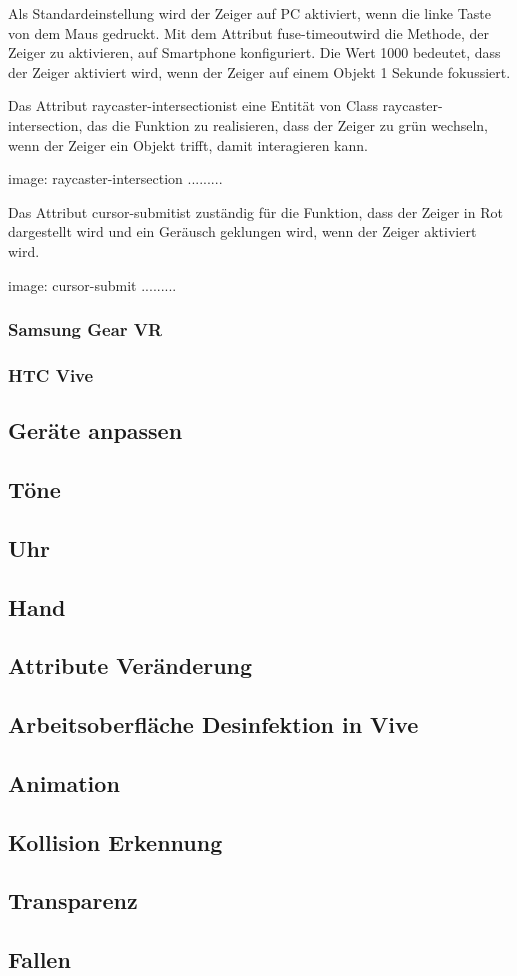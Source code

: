   Als Standardeinstellung wird der Zeiger auf PC aktiviert, wenn die linke Taste von dem Maus gedruckt. Mit dem Attribut \glqq fuse-timeout\grqq wird die Methode, der Zeiger zu aktivieren, auf Smartphone konfiguriert. Die Wert 1000 bedeutet, dass der Zeiger aktiviert wird, wenn der Zeiger auf einem Objekt 1 Sekunde fokussiert.
  
  Das Attribut \glqq raycaster-intersection\grqq ist eine Entität von Class \glqq raycaster-intersection\grqq, das die Funktion zu realisieren, dass der Zeiger zu grün wechseln, wenn der Zeiger ein Objekt trifft, damit interagieren kann.
  
  image: raycaster-intersection .........
  
  Das Attribut \glqq cursor-submit\grqq ist zuständig für die Funktion, dass der Zeiger in Rot dargestellt wird und ein Geräusch geklungen wird, wenn der Zeiger aktiviert wird. 
  
  image: cursor-submit .........
  
  
  \subsubsection{Samsung Gear VR}
  \subsubsection{HTC Vive}
 \subsection{Geräte anpassen}
 \subsection{Töne}
 \subsection{Uhr}
 \subsection{Hand}
 \subsection{Attribute Veränderung}
 
 \subsection{Arbeitsoberfläche Desinfektion in Vive}
 \subsection{Animation}
 \subsection{Kollision Erkennung}
 \subsection{Transparenz}
 \subsection{Fallen}


